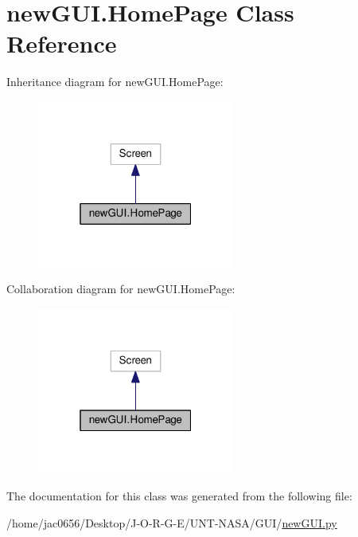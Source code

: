 \hypertarget{classnewGUI_1_1HomePage}{}\section{new\+G\+U\+I.\+Home\+Page Class Reference}
\label{classnewGUI_1_1HomePage}


Inheritance diagram for new\+G\+U\+I.\+Home\+Page\+:\nopagebreak
\begin{figure}[H]
\begin{center}
\leavevmode
\includegraphics[width=184pt]{classnewGUI_1_1HomePage__inherit__graph}
\end{center}
\end{figure}


Collaboration diagram for new\+G\+U\+I.\+Home\+Page\+:\nopagebreak
\begin{figure}[H]
\begin{center}
\leavevmode
\includegraphics[width=184pt]{classnewGUI_1_1HomePage__coll__graph}
\end{center}
\end{figure}


The documentation for this class was generated from the following file\+:\begin{DoxyCompactItemize}
\item 
/home/jac0656/\+Desktop/\+J-\/\+O-\/\+R-\/\+G-\/\+E/\+U\+N\+T-\/\+N\+A\+S\+A/\+G\+U\+I/\hyperlink{newGUI_8py}{new\+G\+U\+I.\+py}\end{DoxyCompactItemize}
